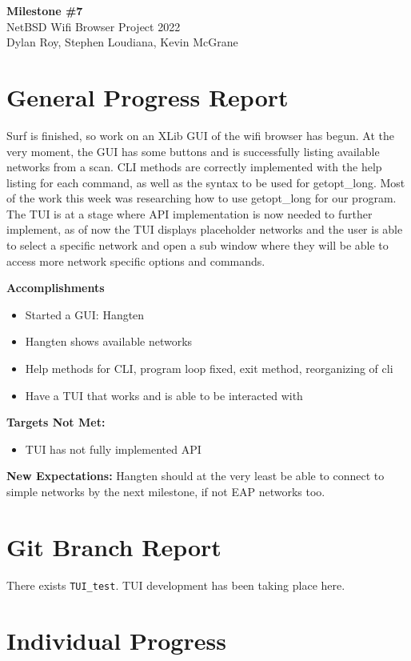 \documentclass[11pt]{article}
\begin{document}
\begin{center}
  \textbf{\Large Milestone \#7}\\\large NetBSD Wifi Browser Project 2022\\
  Dylan Roy, Stephen Loudiana, Kevin McGrane
\end{center}

\section{General Progress Report}
Surf is finished, so work on an XLib GUI of the wifi browser has begun.
At the very moment, the GUI has some buttons and is successfully
listing available networks from a scan. CLI methods are correctly implemented 
with the help listing for each command, as well as the syntax to be used for 
getopt\_long. Most of the work this week was researching how to use getopt\_long 
for our program. The TUI is at a stage where API implementation is now needed to further implement, as of now the TUI displays placeholder networks and the user is able to select a specific network and open a sub window where they will be able to access more network specific options and commands.

\textbf{Accomplishments}
\begin{itemize}
  \item Started a GUI: Hangten
  \item Hangten shows available networks
  \item Help methods for CLI, program loop fixed, exit method, reorganizing of cli
  \item Have a TUI that works and is able to be interacted with
\end{itemize}

\textbf{Targets Not Met:}
\begin{itemize}
  \item TUI has not fully implemented API
\end{itemize}

\textbf{New Expectations:}
Hangten should at the very least be able to connect to simple networks by the
next milestone, if not EAP networks too.

\section{Git Branch Report}
There exists \texttt{TUI\_test}. TUI development has been taking place here.

\newpage
\section{Individual Progress}
\end{document}
